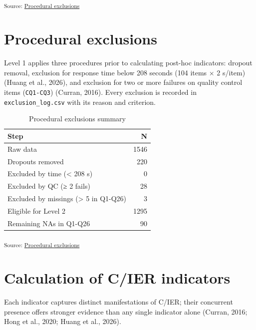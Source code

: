 \documentclass[
  letterpaper,
  DIV=11,
  numbers=noendperiod]{scrartcl}
\begin{document}
\textsubscript{Source:
\href{https://phdpablo.github.io/cier/Scripts/ProcessingScripts/01_procedural-preview.html\#cell-data-reading}{Procedural
exclusions}}

\section{Procedural exclusions}\label{procedural-exclusions}

Level 1 applies three procedures prior to calculating post-hoc
indicators: dropout removal, exclusion for response time below 208
seconds (104 items × 2 s/item) (Huang et al., 2026), and exclusion for
two or more failures on quality control items (\texttt{CQ1-CQ3})
(Curran, 2016). Every exclusion is recorded in
\texttt{exclusion\_log.csv} with its reason and criterion.

{

\begin{longtable}[]{@{}lr@{}}

\caption{\label{tbl-level-1-summary}Procedural exclusions summary}

\tabularnewline

\toprule\noalign{}
Step & N \\
\midrule\noalign{}
\endhead
\bottomrule\noalign{}
\endlastfoot
Raw data & 1546 \\
Dropouts removed & 220 \\
Excluded by time (\textless{} 208 s) & 0 \\
Excluded by QC (≥ 2 fails) & 28 \\
Excluded by missings (\textgreater{} 5 in Q1-Q26) & 3 \\
Eligible for Level 2 & 1295 \\
Remaining NAs in Q1-Q26 & 90 \\

\end{longtable}

}

\textsubscript{Source:
\href{https://phdpablo.github.io/cier/Scripts/ProcessingScripts/01_procedural-preview.html\#cell-tbl-level-1-summary}{Procedural
exclusions}}

\section{Calculation of C/IER
indicators}\label{calculation-of-cier-indicators}

Each indicator captures distinct manifestations of C/IER; their
concurrent presence offers stronger evidence than any single indicator
alone (Curran, 2016; Hong et al., 2020; Huang et al., 2026).
\end{document}
